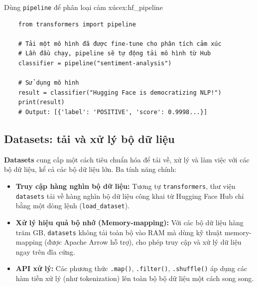 \begin{example}{Dùng \texttt{pipeline} để phân loại cảm xúc}{ex:hf_pipeline}
    \begin{verbatim}
    from transformers import pipeline

    # Tải một mô hình đã được fine-tune cho phân tích cảm xúc
    # Lần đầu chạy, pipeline sẽ tự động tải mô hình từ Hub
    classifier = pipeline("sentiment-analysis")

    # Sử dụng mô hình
    result = classifier("Hugging Face is democratizing NLP!")
    print(result)
    # Output: [{'label': 'POSITIVE', 'score': 0.9998...}]
    \end{verbatim}
\end{example}

\subsection{Datasets: tải và xử lý bộ dữ liệu}
\label{ssec:hf_datasets}
\textbf{Datasets} cung cấp một cách tiêu chuẩn hóa để tải về, xử lý và làm việc với các bộ dữ liệu, kể cả các bộ dữ liệu lớn. Ba tính năng chính:
\begin{itemize}
    \item \textbf{Truy cập hàng nghìn bộ dữ liệu:} Tương tự \texttt{transformers}, thư viện \texttt{datasets} tải về hàng nghìn bộ dữ liệu công khai từ Hugging Face Hub chỉ bằng một dòng lệnh (\texttt{load\_dataset}).
    \item \textbf{Xử lý hiệu quả bộ nhớ (Memory-mapping):} Với các bộ dữ liệu hàng trăm GB, \texttt{datasets} không tải toàn bộ vào RAM mà dùng kỹ thuật memory-mapping (được Apache Arrow hỗ trợ), cho phép truy cập và xử lý dữ liệu ngay trên đĩa cứng.
    \item \textbf{API xử lý:} Các phương thức \texttt{.map()}, \texttt{.filter()}, \texttt{.shuffle()} áp dụng các hàm tiền xử lý (như tokenization) lên toàn bộ bộ dữ liệu một cách song song.
\end{itemize}

